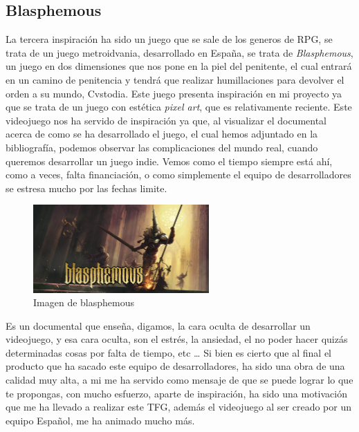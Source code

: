 \documentclass[a4paper]{article}
\begin{document}
\begin{appendices}
    \subsection{Blasphemous}
    La tercera inspiración ha sido un juego que se sale de los generos de RPG, se trata de un juego metroidvania, desarrollado en España, se trata de \textit{Blasphemous},
    un juego en dos dimensiones que nos pone en la piel del penitente, el cual entrará en un camino de penitencia y tendrá que realizar humillaciones para devolver el orden a su mundo, Cvstodia.
    Este juego presenta inspiración en mi proyecto ya que se trata de un juego con estética \textit{pixel art}, que es relativamente reciente. Este videojuego nos ha servido de inspiración ya que,
    al visualizar el documental acerca de como se ha desarrollado el juego, el cual hemos adjuntado en la bibliografía, podemos observar las complicaciones del mundo real, cuando queremos desarrollar un juego indie.
    Vemos como el tiempo siempre está ahí, como a veces, falta financiación, o como simplemente el equipo de desarrolladores se estresa mucho por las fechas limite.

    \begin{figure}[ht]
        \centering
        \includegraphics[width=0.6\textwidth]{Images/H2x1_NSwitchDS_Blasphemous_image1600w.jpg}
        \caption{Imagen de blasphemous}
        \label{fig:blasphemous}
    \end{figure}

    Es un documental que enseña, digamos, la cara oculta de desarrollar un videojuego, y esa cara oculta, son el estrés, la ansiedad, el no poder hacer quizás determinadas cosas por falta de tiempo, etc \dots
    Si bien es cierto que al final el producto que ha sacado este equipo de desarrolladores, ha sido una obra de una calidad muy alta, a mi me ha servido como mensaje de que se puede lograr lo que te propongas, con mucho esfuerzo,
    aparte de inspiración, ha sido una motivación que me ha llevado a realizar este TFG, además el videojuego al ser creado por un equipo Español, me ha animado mucho más.\\


\end{appendices}
\end{document}
